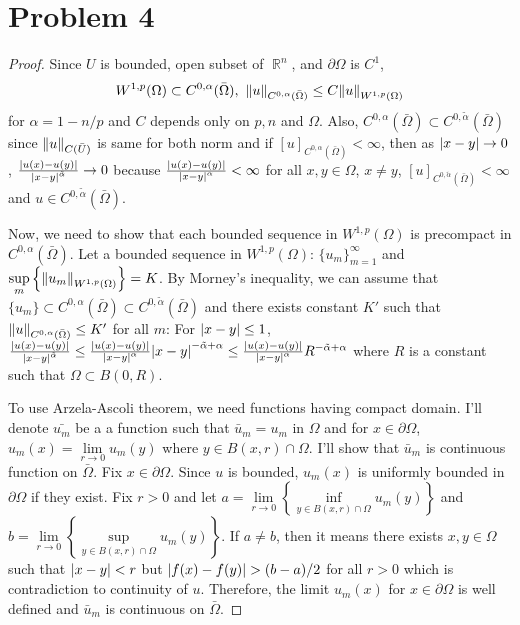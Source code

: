\documentclass{article}
\DeclareMathOperator{\rr}{\mathbb{R}}
\begin{document}
\section*{Problem 4}
\begin{proof}
Since $U$ is bounded, open subset of $\rr^n$, and $\partial \Omega$ is $C^1$,
\begin{equation*}
W^{1,p}(\Omega)\subset C^{0, \alpha}(\bar{\Omega}),~\norm{u}_{C^{0, \alpha}(\bar{\Omega})}\leq C\norm{u}_{W^{1,p}(\Omega)}
\end{equation*}
for $\alpha=1-n/p$ and $C$ depends only on $p,n$ and $\Omega$. Also, $C^{0, \alpha}(\bar{\Omega})\subset C^{0, \tilde{\alpha}}(\bar{\Omega})$ since $\norm{u}_{C(\bar{U})}$ is same for both norm and if $[u]_{C^{0, \alpha}(\bar{\Omega})}<\infty$, then as $\abs{x-y}\rightarrow 0$, $\frac{\abs{u(x)-u(y)}}{\abs{x-y}^{\tilde{\alpha}}}\rightarrow 0$ because $\frac{\abs{u(x)-u(y)}}{\abs{x-y}^{\alpha}}<\infty$ for all $x,y\in \Omega$, $x\neq y$, $[u]_{C^{0,\tilde{\alpha}}(\bar{\Omega})}<\infty$ and $u\in C^{0, \tilde{\alpha}}(\bar{\Omega})$.

Now, we need to show that each bounded sequence in $W^{1,p}(\Omega)$ is precompact in $C^{0, \alpha}(\bar{\Omega})$. Let a bounded sequence in $W^{1,p}(\Omega)$: $\{u_m\}_{m=1}^\infty$ and $\sup\limits_m\left\{\norm{u_m}_{W^{1,p}(\Omega)}\right\}=K$. 
By Morney's inequality, we can assume that $\{u_m\}\subset C^{0, \alpha}(\bar{\Omega})\subset C^{0, \tilde{\alpha}}(\bar{\Omega})$ and there exists constant $K'$ such that $\norm{u}_{C^{0, \alpha}(\bar{\Omega})}\leq K'$ for all $m$: For $\abs{x-y}\leq 1$, $\frac{\abs{u(x)-u(y)}}{\abs{x-y}^{\tilde{\alpha}}}\leq \frac{\abs{u(x)-u(y)}}{\abs{x-y}^{\alpha}}\abs{x-y}^{-\tilde{\alpha}+\alpha}\leq \frac{\abs{u(x)-u(y)}}{\abs{x-y}^{\alpha}} R^{-\tilde{\alpha}+\alpha}$ where $R$ is a constant such that $\Omega\subset B(0, R)$.

To use Arzela-Ascoli theorem, we need functions having compact domain. I'll denote $\bar{u_m}$ be a a function such that $\bar{u}_m=u_m$ in $\Omega$ and for $x\in \partial \Omega$, $u_m(x)=\lim\limits_{r\rightarrow 0} u_m(y)$ where $y\in B(x, r)\cap \Omega$. I'll show that $\bar{u}_m$ is continuous function on $\bar{\Omega}$. Fix $x\in \partial \Omega$. Since $u$ is bounded, $u_m(x)$ is uniformly bounded in $\partial \Omega$ if they exist. Fix $r>0$ and let $a=\lim\limits_{r\rightarrow 0}\left\{\inf\limits_{y\in B(x,r)\cap \Omega} u_m(y)\right\}$ and $b=\lim\limits_{r\rightarrow 0}\left\{\sup\limits_{y\in B(x,r)\cap \Omega} u_m(y)\right\}$. If $a\neq b$, then it means there exists $x,y\in \Omega$ such that $\abs{x-y}<r$ but $\abs{f(x)-f(y)}>(b-a)/2$ for all $r>0$ which is contradiction to continuity of $u$. Therefore, the limit $u_m(x)$ for $x\in \partial \Omega$ is well defined and $\bar{u}_m$ is continuous on $\bar{\Omega}$.


\end{proof}
\end{document}
